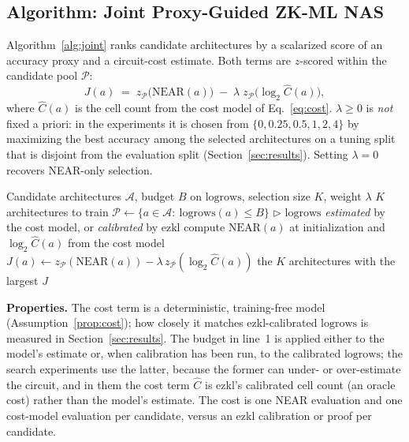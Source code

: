 \documentclass[10pt]{article}
\newcommand{\logrows}{\mathrm{logrows}}
\begin{document}
\subsection{Algorithm: Joint Proxy-Guided ZK-ML NAS}

Algorithm~\ref{alg:joint} ranks candidate architectures by a scalarized score of an accuracy proxy and a
circuit-cost estimate.  Both terms are $z$-scored within the candidate pool $\mathcal{P}$:
\[
J(a) \;=\; z_{\mathcal{P}}\bigl(\mathrm{NEAR}(a)\bigr) \;-\; \lambda\; z_{\mathcal{P}}\bigl(\log_2 \hat C(a)\bigr),
\]
where $\hat C(a)$ is the cell count from the cost model of Eq.~\eqref{eq:cost}.  $\lambda\ge0$ is \emph{not}
fixed a priori: in the experiments it is chosen from $\{0,0.25,0.5,1,2,4\}$ by maximizing the best accuracy among the
selected architectures on a tuning split that is disjoint from the evaluation split (Section~\ref{sec:results}).
Setting $\lambda=0$ recovers NEAR-only selection.

\begin{algorithm}[h]
\caption{Joint Proxy-Guided ZK-ML NAS}
\label{alg:joint}
\begin{algorithmic}[1]
\Require Candidate architectures $\mathcal{A}$, budget $B$ on $\logrows$, selection size $K$, weight $\lambda$
\Ensure $K$ architectures to train
\State $\mathcal{P}\leftarrow\{a\in\mathcal{A}:\ \logrows(a)\le B\}$
       \hfill $\triangleright$ $\logrows$ \emph{estimated} by the cost model, or \emph{calibrated} by ezkl
  \State compute $\mathrm{NEAR}(a)$ at initialization and $\log_2\hat C(a)$ from the cost model
\EndFor
\State $J(a)\leftarrow z_{\mathcal{P}}(\mathrm{NEAR}(a))-\lambda\, z_{\mathcal{P}}(\log_2\hat C(a))$
\State \Return the $K$ architectures with the largest $J$
\end{algorithmic}
\end{algorithm}

\textbf{Properties.}  The cost term is a deterministic, training-free model (Assumption~\ref{prop:cost}); how closely it
matches ezkl-calibrated $\logrows$ is measured in Section~\ref{sec:results}.  The budget in line~1 is applied either to the
model's estimate or, when calibration has been run, to the calibrated $\logrows$; the search experiments use
the latter, because the former can under- or over-estimate the circuit, and in them the cost term $\hat C$ is ezkl's calibrated cell count (an oracle cost) rather than the model's estimate.  The cost is one NEAR evaluation and one cost-model
evaluation per candidate, versus an ezkl calibration or proof per candidate.
\end{document}
